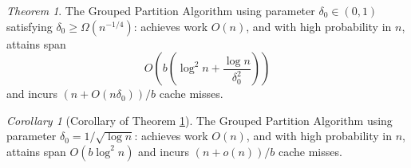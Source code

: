 \documentclass[sigconf]{acmart}
\theoremstyle{remark}
\newtheorem{theorem}{Theorem}[section]
\newtheorem{corollary}[thm]{Corollary}
\theoremstyle{remark}
\begin{document}
\begin{theorem}
	\label{thm:groupedPartitionAlg}
	The Grouped Partition Algorithm using parameter $\delta_0\in(0,1)$ satisfying $\delta_0 \ge \Omega(n^{-1/4})$: achieves work $O(n)$, and with high probability in $n$, attains span 
	$$O\left(b\left(\log^2 n + \frac{\log n}{\delta_0^2}\right)\right)$$
	and incurs $(n+O(n \delta_0))/b$ cache misses. 
\end{theorem}

\begin{corollary}[Corollary of Theorem \ref{thm:groupedPartitionAlg}]
	\label{cor:groupedPartitionAlg}
	The Grouped Partition Algorithm using parameter $\delta_0=1/\sqrt{\log n}$:
	achieves work $O(n)$, and with high probability in $n$, attains span $O(b\log^2 n)$ and incurs $(n+o(n))/b$ cache misses. 
\end{corollary}
\end{document}
